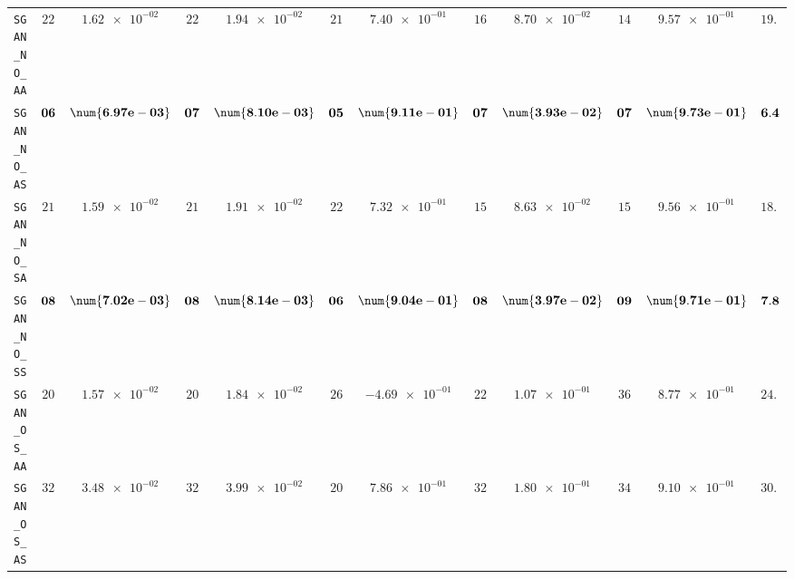 \begin{xltabular}{\textwidth}{l||cC|cC|cC|cC|cC||c}
	\texttt{SGAN\_NO\_AA} & $ 22$ & $ \num{1.62e-02}$ & $ 22$ & $ \num{1.94e-02}$ & $ 21$ & $ \num{7.40e-01}$ & $ 16$ & $ \num{8.70e-02}$ & $ 14$ & $ \num{9.57e-01}$ & $ 19.0$  \\
	\texttt{SGAN\_NO\_AS} & $\bf 06$ & $\bf \num{6.97e-03}$ & $\bf 07$ & $\bf \num{8.10e-03}$ & $\bf 05$ & $\bf \num{9.11e-01}$ & $\bf 07$ & $\bf \num{3.93e-02}$ & $\bf 07$ & $\bf \num{9.73e-01}$ & $\bf 6.4$  \\
	\texttt{SGAN\_NO\_SA} & $ 21$ & $ \num{1.59e-02}$ & $ 21$ & $ \num{1.91e-02}$ & $ 22$ & $ \num{7.32e-01}$ & $ 15$ & $ \num{8.63e-02}$ & $ 15$ & $ \num{9.56e-01}$ & $ 18.8$  \\
	\texttt{SGAN\_NO\_SS} & $\bf 08$ & $\bf \num{7.02e-03}$ & $\bf 08$ & $\bf \num{8.14e-03}$ & $\bf 06$ & $\bf \num{9.04e-01}$ & $\bf 08$ & $\bf \num{3.97e-02}$ & $\bf 09$ & $\bf \num{9.71e-01}$ & $\bf 7.8$  \\
	\texttt{SGAN\_OS\_AA} & $ 20$ & $ \num{1.57e-02}$ & $ 20$ & $ \num{1.84e-02}$ & $ 26$ & $ \num{-4.69e-01}$ & $ 22$ & $ \num{1.07e-01}$ & $ 36$ & $ \num{8.77e-01}$ & $ 24.8$  \\
	\texttt{SGAN\_OS\_AS} & $ 32$ & $ \num{3.48e-02}$ & $ 32$ & $ \num{3.99e-02}$ & $ 20$ & $ \num{7.86e-01}$ & $ 32$ & $ \num{1.80e-01}$ & $ 34$ & $ \num{9.10e-01}$ & $ 30.0$  \\

\end{xltabular}

